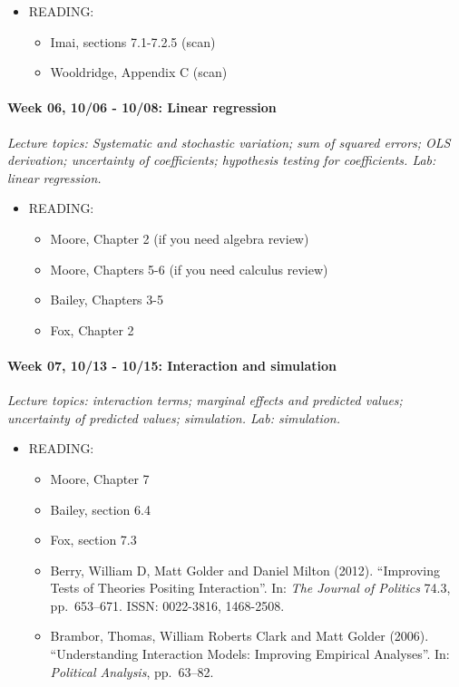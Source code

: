 \documentclass[11pt]{article}
\providecommand{\tightlist}{%
  \setlength{\itemsep}{0pt}\setlength{\parskip}{0pt}}
\begin{document}
\begin{itemize}
\tightlist
\item
  READING:
  \begin{itemize}
  \tightlist
  \item Imai, sections 7.1-7.2.5 (scan)
  \item
    Wooldridge, Appendix C (scan)
  \end{itemize}
\end{itemize}

\paragraph{Week 06, 10/06 - 10/08: Linear regression\\}
\emph{Lecture topics: Systematic and stochastic variation; sum of squared errors; OLS derivation; uncertainty of coefficients; hypothesis testing for coefficients. Lab: linear regression.}\\

\begin{itemize}
\tightlist
\item
  READING:
  \begin{itemize}
  \item
    Moore, Chapter 2 (if you need algebra review)
    \item
    Moore, Chapters 5-6 (if you need calculus review)
  \item
    Bailey, Chapters 3-5
  \item
    Fox, Chapter 2
  \end{itemize}
\end{itemize}

\paragraph{Week 07, 10/13 - 10/15: Interaction and simulation\\}
\emph{Lecture topics: interaction terms; marginal effects and predicted values; uncertainty of predicted values; simulation. Lab: simulation.}\\

\begin{itemize}
\tightlist
\item
  READING:
  \begin{itemize}
  \item
    Moore, Chapter 7
  \item
    Bailey, section 6.4
  \item
    Fox, section 7.3
  \item
    Berry, William D, Matt Golder and Daniel Milton (2012). ``Improving
    Tests of Theories Positing Interaction''. In:
    \emph{The Journal of Politics} 74.3, pp.~653--671. ISSN: 0022-3816,
    1468-2508.
  \item
    Brambor, Thomas, William Roberts Clark and Matt Golder (2006).
    ``Understanding Interaction Models: Improving Empirical Analyses''.
    In: \emph{Political Analysis}, pp.~63--82.
  \end{itemize}

\end{itemize}
\end{document}
